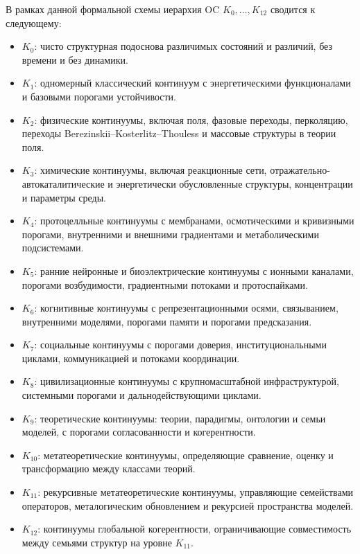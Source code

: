 В рамках данной формальной схемы иерархия OC \(K_0,\dots,K_{12}\) сводится к следующему:

\begin{itemize}
    \item \(K_0\): чисто структурная подоснова различимых состояний и различий, без времени и без динамики.
    \item \(K_1\): одномерный классический континуум с энергетическими функционалами и базовыми порогами устойчивости.
    \item \(K_2\): физические континуумы, включая поля, фазовые переходы, перколяцию,
          переходы Berezinskii--Kosterlitz--Thouless и массовые структуры в теории поля.
    \item \(K_3\): химические континуумы, включая реакционные сети, отражательно-автокаталитические
          и энергетически обусловленные структуры, концентрации и параметры среды.
    \item \(K_4\): протоцелльные континуумы с мембранами, осмотическими и кривизными порогами,
          внутренними и внешними градиентами и метаболическими подсистемами.
    \item \(K_5\): ранние нейронные и биоэлектрические континуумы с ионными каналами,
          порогами возбудимости, градиентными потоками и протоспайками.
    \item \(K_6\): когнитивные континуумы с репрезентационными осями, связыванием,
          внутренними моделями, порогами памяти и порогами предсказания.
    \item \(K_7\): социальные континуумы с порогами доверия, институциональными циклами,
          коммуникацией и потоками координации.
    \item \(K_8\): цивилизационные континуумы с крупномасштабной инфраструктурой,
          системными порогами и дальнодействующими циклами.
    \item \(K_9\): теоретические континуумы: теории, парадигмы, онтологии и семьи моделей,
          с порогами согласованности и когерентности.
    \item \(K_{10}\): метатеоретические континуумы, определяющие сравнение, оценку и трансформацию между классами теорий.
    \item \(K_{11}\): рекурсивные метатеоретические континуумы, управляющие семействами операторов,
          металогическим обновлением и рекурсией пространства моделей.
    \item \(K_{12}\): континуумы глобальной когерентности, ограничивающие совместимость между
          семьями структур на уровне \(K_{11}\).
\end{itemize}

